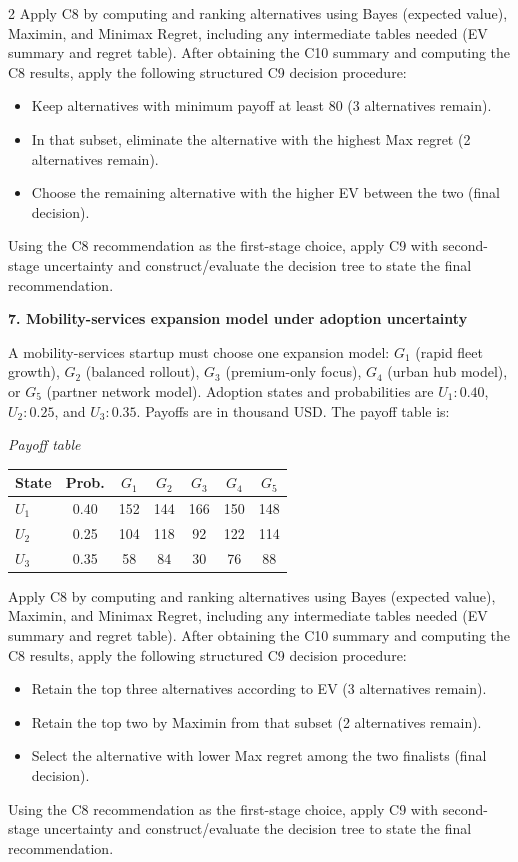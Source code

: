 \documentclass[12pt]{article}
\newcommand{\SubsectionBox}[1]{%
	\noindent\colorbox{gray!30}{%
		\parbox{\linewidth}{\textbf{#1}}%
	}\par\vspace{0.35cm}%
}
\begin{document}
\begin{multicols}{2}
		Apply C8 by computing and ranking alternatives using Bayes (expected value), Maximin, and Minimax Regret, including any intermediate tables needed (EV summary and regret table).
		After obtaining the C10 summary and computing the C8 results, apply the following structured C9 decision procedure:
		\begin{itemize}
			\item Keep alternatives with minimum payoff at least 80 (3 alternatives remain).
			\item In that subset, eliminate the alternative with the highest Max regret (2 alternatives remain).
			\item Choose the remaining alternative with the higher EV between the two (final decision).
		\end{itemize}
		Using the C8 recommendation as the first-stage choice, apply C9 with second-stage uncertainty and construct/evaluate the decision tree to state the final recommendation.

		\vspace{0.25cm}
		\SubsectionBox{7. Mobility-services expansion model under adoption uncertainty}\vspace{-0.25cm}
		A mobility-services startup must choose one expansion model: $G_1$ (rapid fleet growth), $G_2$ (balanced rollout), $G_3$ (premium-only focus), $G_4$ (urban hub model), or $G_5$ (partner network model).
		Adoption states and probabilities are $U_1:0.40$, $U_2:0.25$, and $U_3:0.35$. Payoffs are in thousand USD. The payoff table is:
		
		\begin{center}
			\textit{Payoff table} \\
			\begin{tabular}{l c c c c c c}
				\hline
				State& Prob. & $G_1$ & $G_2$ & $G_3$ & $G_4$ & $G_5$ \\
				\hline
				$U_1$ & 0.40 & 152 & 144 & 166 & 150 & 148 \\
				$U_2$ & 0.25 & 104 & 118 & 92 & 122 & 114 \\
				$U_3$ & 0.35 & 58 & 84 & 30 & 76 & 88 \\
				\hline
			\end{tabular}
		\end{center}
		
		Apply C8 by computing and ranking alternatives using Bayes (expected value), Maximin, and Minimax Regret, including any intermediate tables needed (EV summary and regret table).
		After obtaining the C10 summary and computing the C8 results, apply the following structured C9 decision procedure:
		\begin{itemize}
			\item Retain the top three alternatives according to EV (3 alternatives remain).
			\item Retain the top two by Maximin from that subset (2 alternatives remain).
			\item Select the alternative with lower Max regret among the two finalists (final decision).
		\end{itemize}
		Using the C8 recommendation as the first-stage choice, apply C9 with second-stage uncertainty and construct/evaluate the decision tree to state the final recommendation.


\end{multicols}
\end{document}

